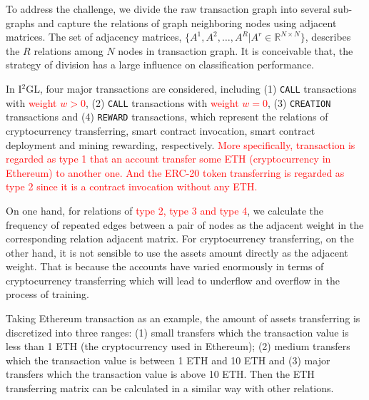 To address the challenge, we divide the raw transaction graph into several sub-graphs and capture the relations of graph neighboring nodes using adjacent matrices. The set of adjacency matrices, $\{A^1,A^2,\dots,A^R|A^r\in \mathbb{R}^{N \times N}\}$, describes the $R$ relations among $N$ nodes in transaction graph. It is conceivable that, the strategy of division has a large influence on classification performance.

In I$^2$GL, four major transactions are considered, including (1) \texttt{CALL} transactions with \textcolor{red}{weight $w>0$}, (2) \texttt{CALL} transactions with \textcolor{red}{weight $w=0$}, (3) \texttt{CREATION} transactions and (4) \texttt{REWARD} transactions, which represent the relations of cryptocurrency transferring, smart contract invocation, smart contract deployment and mining rewarding, respectively. \textcolor{red}{More specifically, transaction is regarded as type 1 that an account transfer some ETH (cryptocurrency in Ethereum) to another one. And the ERC-20 token transferring is regarded as type 2 since it is a contract invocation without any ETH.}

On one hand, for relations of \textcolor{red}{type 2, type 3 and type 4}, we calculate the frequency of repeated edges between a pair of nodes as the adjacent weight in the corresponding relation adjacent matrix. For cryptocurrency transferring, on the other hand, it is not sensible to use the assets amount directly as the adjacent weight. That is because the accounts have varied enormously in terms of cryptocurrency transferring which will lead to underflow and overflow in the process of training.

 Taking Ethereum transaction as an example, the amount of assets transferring is discretized into three ranges: (1) small transfers which the transaction value is less than 1 ETH (the cryptocurrency used in Ethereum); (2) medium transfers which the transaction value is between 1 ETH and 10 ETH and (3) major transfers which the transaction value is above 10 ETH. Then the ETH transferring matrix can be calculated in a similar way with other relations.



